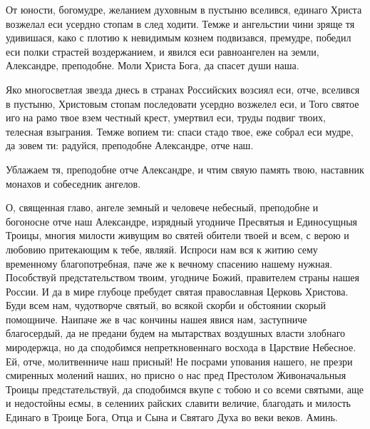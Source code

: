 \mychapterending{}


\begin{mymulticols}



От юности, богомудре, желанием духовным в пустыню вселився, единаго Христа возжелал еси усердно стопам в след ходити. Темже и ангельстии чини зряще тя удивишася, како с плотию к невидимым кознем подвизався, премудре, победил еси полки страстей воздержанием, и явился еси равноангелен на земли, Александре, преподобне. Моли Христа Бога, да спасет души наша.




Яко многосветлая звезда днесь в странах Российских возсиял еси, отче, вселився в пустыню, Христовым стопам последовати усердно возжелел еси, и Того святое иго на рамо твое взем честный крест, умертвил еси, труды подвиг твоих, телесная взыграния. Темже вопием ти: спаси стадо твое, еже собрал еси мудре, да зовем ти: радуйся, преподобне Александре, отче наш.




Ублажаем тя, преподобне отче Александре, и чтим свяую память твою, наставник монахов и собеседник ангелов.




О, священная главо, ангеле земный и человече небесный, преподобне и богоносне отче наш Александре, изрядный угодниче Пресвятыя и Единосущныя Троицы, многия милости живущим во святей обители твоей и всем, с верою и любовию притекающим к тебе, являяй. Испроси нам вся к житию сему временному благопотребная, паче же к вечному спасению нашему нужная. Пособствуй предстательством твоим, угодниче Божий, правителем страны нашея России. И да в мире глубоце пребудет святая православная Церковь Христова. Буди всем нам, чудотворче святый, во всякой скорби и обстоянии скорый помощниче. Наипаче же в час кончины нашея явися нам, заступниче благосердый, да не предани будем на мытарствах воздушных власти злобнаго миродержца, но да сподобимся непреткновеннаго восхода в Царствие Небесное. Ей, отче, молитвенниче наш присный! Не посрами упования нашего, не презри смиренных молений наших, но присно о нас пред Престолом Живоначальныя Троицы предстательствуй, да сподобимся вкупе с тобою и со всеми святыми, аще и недостойны есмы, в селениих райских славити величие, благодать и милость Единаго в Троице Бога, Отца и Сына и Святаго Духа во веки веков. Аминь.


\end{mymulticols}

